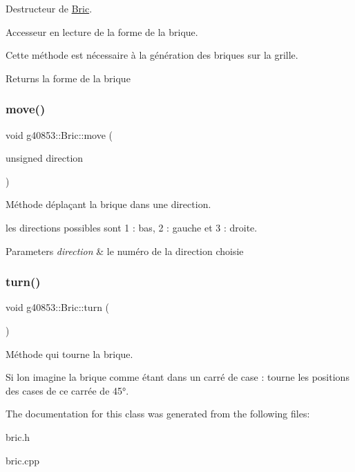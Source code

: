 Destructeur de \hyperlink{classg40853_1_1_bric}{Bric}. 

Accesseur en lecture de la forme de la brique.

Cette méthode est nécessaire à la génération des briques sur la grille.

\begin{DoxyReturn}{Returns}
la forme de la brique 
\end{DoxyReturn}
\hypertarget{classg40853_1_1_bric_aa77e0c1fdc6b32e9121f6db4c7630bfc}{}\label{classg40853_1_1_bric_aa77e0c1fdc6b32e9121f6db4c7630bfc} 
\subsubsection{\texorpdfstring{move()}{move()}}
{\footnotesize\ttfamily void g40853\+::\+Bric\+::move (\begin{DoxyParamCaption}\item[{unsigned}]{direction }\end{DoxyParamCaption})}



Méthode déplaçant la brique dans une direction. 

les directions possibles sont 1 \+: bas, 2 \+: gauche et 3 \+: droite.


\begin{DoxyParams}{Parameters}
{\em direction} & le numéro de la direction choisie \\
\hline
\end{DoxyParams}
\hypertarget{classg40853_1_1_bric_aa962ac3aada1e2aaf234effa2544d07e}{}\label{classg40853_1_1_bric_aa962ac3aada1e2aaf234effa2544d07e} 
\subsubsection{\texorpdfstring{turn()}{turn()}}
{\footnotesize\ttfamily void g40853\+::\+Bric\+::turn (\begin{DoxyParamCaption}{ }\end{DoxyParamCaption})}



Méthode qui tourne la brique. 

Si l\textquotesingle{}on imagine la brique comme étant dans un carré de case \+: tourne les positions des cases de ce carrée de 45°. 

The documentation for this class was generated from the following files\+:\begin{DoxyCompactItemize}
\item 
bric.\+h\item 
bric.\+cpp\end{DoxyCompactItemize}
